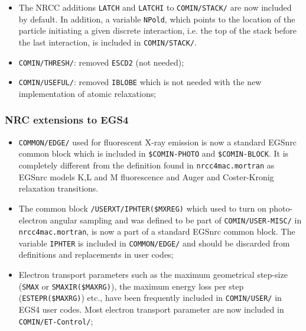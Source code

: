 \begin{itemize}
\item
The NRCC additions {\tt LATCH} and {\tt LATCHI}
to {\tt COMIN/STACK/} are now included by default. In addition,
a variable {\tt NPold}, which points to the location of the particle
initiating a given discrete interaction, i.e. the top
of the stack before the last interaction, is included in {\tt COMIN/STACK/}.
  

\item
{\tt COMIN/THRESH/}: removed {\tt ESCD2} (not needed);
 

\item
{\tt COMIN/USEFUL/}: removed {\tt IBLOBE} which is not needed 
with the new implementation of atomic relaxations;
 

\end{itemize}

\subsubsection{NRC extensions to EGS4}

\begin{itemize}
\item
{\tt COMMON/EDGE/} used for fluorescent X-ray emission 
is now a standard EGSnrc common block which is included 
in {\tt \$COMIN-PHOTO} and {\tt \$COMIN-BLOCK}. 
It is completely different from the definition found 
in {\tt nrcc4mac.mortran} as EGSnrc models K,L and M 
fluorescence and Auger and Coster-Kronig relaxation transitions.
 

\item
The common block {\tt /USERXT/IPHTER(\$MXREG)} which
used to turn on photo-electron 
angular sampling and was defined to be part of {\tt COMIN/USER-MISC/} 
in {\tt nrcc4mac.mortran},  
is now a part of a standard EGSnrc common block. The variable {\tt IPHTER}
is included in {\tt COMMON/EDGE/} and should be discarded from definitions 
and replacements in user codes;
  

\item
Electron transport parameters such as the maximum geometrical step-size 
({\tt SMAX} or {\tt SMAXIR(\$MAXRG)}), the maximum energy loss per step 
({\tt ESTEPR(\$MAXRG)}) etc., have been frequently included in 
{\tt COMIN/USER/} in EGS4 user codes. Most electron transport 
parameter are now included in {\tt COMIN/ET-Control/};
   

\end{itemize}

